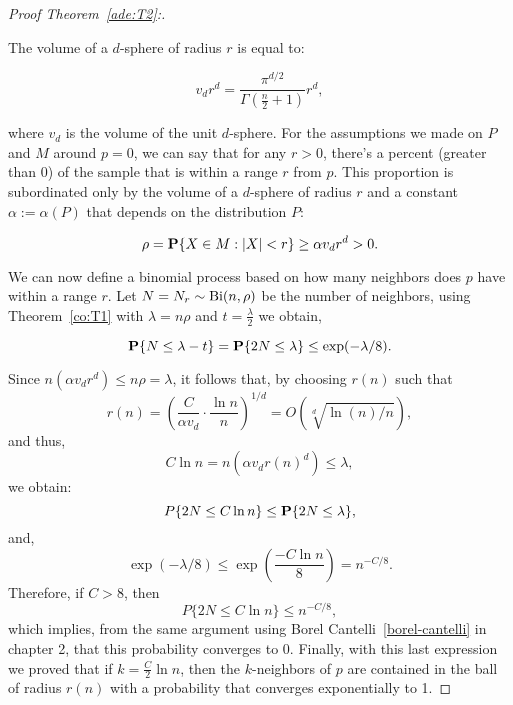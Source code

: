\begin{proof}[Proof Theorem~\ref{ade:T2}:]\label{ade:T2P}

The volume of a $d$-sphere of radius $r$ is equal to:

\[ v_d r^d = \frac{\pi^{d/2}}{\Gamma(\tfrac{n}{2}+1)} r^d, \]

where $v_d$ is the volume of the unit $d$-sphere. For the assumptions we made on $P$ and $M$ around $p = 0$, we can say that for any $r > 0$, there's a percent (greater than 0) of the sample that is within a range $r$ from $p$. This proportion is subordinated only by the volume of a $d$-sphere of radius $r$ and a constant $\alpha := \alpha(P)$ that depends on the distribution $P$:

\[ \rho = \P\{X \in M : |X| < r\} \geq \alpha v_d r^d  > 0.  \] 

We can now define a binomial process based on how many neighbors does $p$ have within a range $r$. Let $N = N_r \sim \Bi(n,\rho)$ be the number of neighbors, using Theorem~\ref{co:T1} with $\lambda = n\rho $ and $t = \tfrac{\lambda}{2}$ we obtain,

\[ \P\{N \leq \lambda - t\} = \P\{2N \leq \lambda \} \leq \exp(-\lambda/8). \] 

Since $n(\alpha v_d r^d) \leq n\rho = \lambda$, it follows that, by choosing $r(n)$ such that 
\[ \tag*{($\star$)} r(n) = {\left(\frac{C}{\alpha v_d} \cdot \frac{\ln n}{n} \right)}^{1/d} = O(\sqrt[d]{\ln(n)/n}),\]
and thus,
\[ C \ln n = n(\alpha v_d r{(n)}^d) \leq \lambda,\]
we obtain:
\[P\{2N \leq C \ln n \} \leq \P\{2N \leq \lambda \}, \]
and,
\[\exp(-\lambda/8)  \leq  \exp\left(\frac{-C\ln n}{8}\right) = n^{-C/8}.\]
Therefore, if $C > 8$, then
\[P\{2N \leq C \ln n \} \leq  n^{-C/8},\]
which implies, from the same argument using Borel Cantelli~\ref{borel-cantelli} in chapter 2, that this probability converges to 0. Finally, with this last expression we proved that if $k = \tfrac{C}{2}\ln n$, then the $k$-neighbors of $p$ are contained in the ball of radius $r(n)$ with a probability that converges exponentially to 1.
\end{proof}

